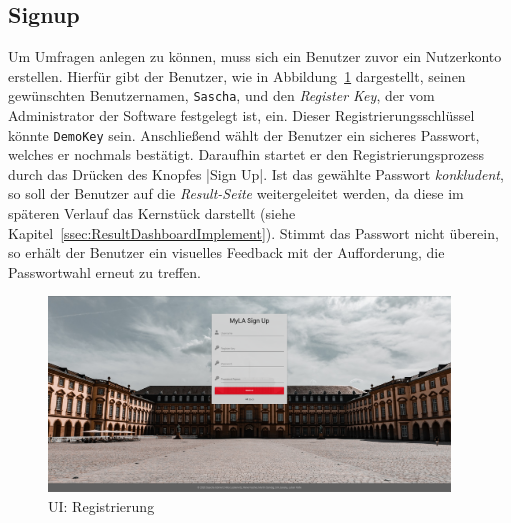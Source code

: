 
\subsection{Signup}
\label{ssec:Signup}

Um Umfragen anlegen zu können, muss sich ein Benutzer zuvor ein Nutzerkonto erstellen.
Hierfür gibt der Benutzer, wie in Abbildung~\ref{fig:SignupImplement} dargestellt, seinen gewünschten Benutzernamen, \zb \texttt{Sascha}, und den \emph{Register Key}, der vom Administrator der Software festgelegt ist, ein.
Dieser Registrierungsschlüssel könnte \texttt{DemoKey} sein.
Anschließend wählt der Benutzer ein sicheres Passwort, welches er nochmals bestätigt.
Daraufhin startet er den Registrierungsprozess durch das Drücken des Knopfes \jinline|Sign Up|.
Ist das gewählte Passwort \emph{konkludent}, so soll der Benutzer auf die \emph{Result-Seite} weitergeleitet werden, da diese im späteren Verlauf \ua das Kernstück darstellt (siehe Kapitel~\vref{ssec:ResultDashboardImplement}).
Stimmt das Passwort nicht überein, so erhält der Benutzer ein visuelles Feedback mit der Aufforderung, die Passwortwahl erneut zu treffen.

\begin{figure}[h]
	\centering
	\includegraphics[width=0.95\textwidth, keepaspectratio]{img/client/Signup.png}
	\captionsetup{justification=centering, format=plain}
	\caption[\acl{UI}: Registrierung]{\acl{UI}: Registrierung \\ \quelleScreenshot}
	\label{fig:SignupImplement}
\end{figure}
